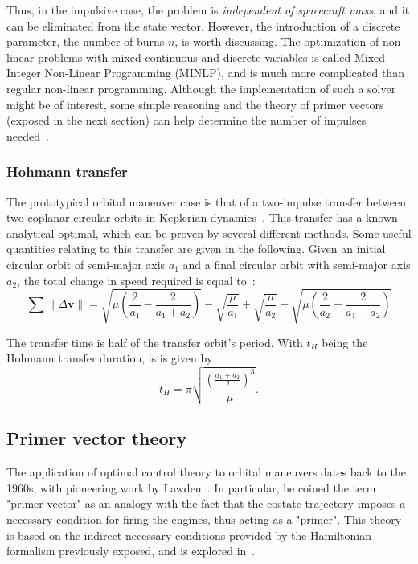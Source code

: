 Thus, in the impulsive case, the problem is \textit{independent of spacecraft mass}, and it can be eliminated from the state vector. However, the introduction of a discrete parameter, the number of burns \(n\), is worth discussing. The optimization of non linear problems with mixed continuous and discrete variables is called Mixed Integer Non-Linear Programming (MINLP), and is much more complicated than regular non-linear programming. Although the implementation of such a solver might be of interest, some simple reasoning and the theory of primer vectors (exposed in the next section) can help determine the number of impulses needed~\cite{interactive_primer_vector}.

\subsubsection{Hohmann transfer}

The prototypical orbital maneuver case is that of a two-impulse transfer between two coplanar circular orbits in Keplerian dynamics~\cite{chobotov}. This transfer has a known analytical optimal, which can be proven by several different methods. Some useful quantities relating to this transfer are given in the following. Given an initial circular orbit of semi-major axis \(a_1\) and a final circular orbit with semi-major axis \(a_2\), the total change in speed required is equal to~\cite{chobotov}:
\begin{equation}\label{eq:hohmann_deltav}
    \sum \lVert \Delta \mathbf{v} \rVert = \sqrt{\mu\left(\frac{2}{a_1}-\frac{2}{a_1+a_2}\right)} - \sqrt{\frac{\mu}{a_1}} + \sqrt{\frac{\mu}{a_2}} - \sqrt{\mu\left(\frac{2}{a_2}-\frac{2}{a_1+a_2}\right)}
\end{equation}

The transfer time is half of the transfer orbit's period. With \(t_H\) being the Hohmann transfer duration, is is given by~\cite{chobotov} 
\begin{equation}\label{eq:hohmann_time}
    t_H = \pi \sqrt{\frac{\left(\frac{a_1+a_2}{2}\right)^3}{\mu}}.
\end{equation}

\subsection{Primer vector theory}

The application of optimal control theory to orbital maneuvers dates back to the 1960s, with pioneering work by Lawden~\cite{Conway_2010}. In particular, he coined the term "primer vector"  as an analogy with the fact that the costate trajectory imposes a necessary condition for firing the engines, thus acting as a "primer". This theory is based on the indirect necessary conditions provided by the Hamiltonian formalism previously exposed, and is explored in~\cite{Conway_2010}.


